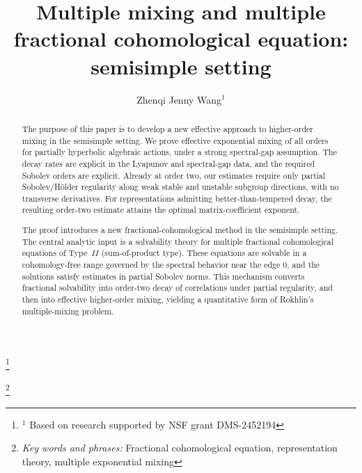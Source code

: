 \documentclass[11 pt]{amsart}
\theoremstyle{definition}
\numberwithin{equation}{section}
\begin{document}
\title[Uniform bounds of correlations]
{Multiple mixing and multiple fractional cohomological equation: semisimple setting}


\thanks{ $^1$ Based on research supported by NSF grant DMS-2452194}

\thanks{{\em Key words and phrases:} Fractional cohomological equation, representation theory, multiple exponential mixing}

\author[]{ Zhenqi Jenny Wang$^1$ }



\address{Department of Mathematics\\
        Michigan State University\\
        East Lansing, MI 48824,USA}

\begin{abstract}

The purpose of this paper is to develop a new effective approach to
higher-order mixing in the semisimple setting. We prove effective exponential mixing of all orders for partially hyperbolic algebraic actions, under a strong spectral-gap assumption. The decay rates are explicit in the Lyapunov and spectral-gap data, and the required Sobolev orders are explicit. Already at order two, our estimates require only partial Sobolev/H\"older regularity along weak stable and unstable subgroup directions, with no transverse derivatives. For representations admitting better-than-tempered decay, the resulting order-two estimate attains the optimal matrix-coefficient exponent.

The proof introduces a new fractional-cohomological method in the semisimple setting. The central analytic input is a solvability theory for multiple fractional cohomological equations of Type~$II$ (sum-of-product type). These equations are solvable in a cohomology-free range governed by the spectral behavior near the edge \(0\), and the solutions satisfy estimates in partial Sobolev norms. This mechanism converts fractional solvability into order-two decay of correlations under partial regularity, and then into effective higher-order mixing, yielding a quantitative form of Rokhlin's multiple-mixing problem.






\end{abstract}
\end{document}
